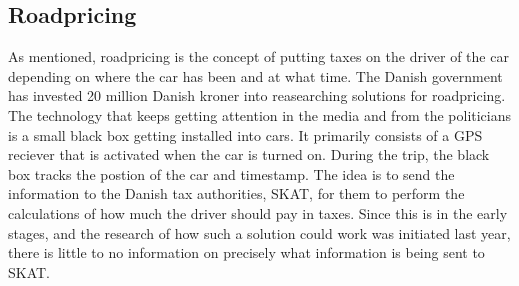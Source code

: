 \subsection{Roadpricing}
As mentioned, roadpricing is the concept of putting taxes on the driver of the car depending on where the car has been and at what time. The Danish government has invested 20 million Danish kroner into reasearching solutions for roadpricing. The technology that keeps getting attention in the media and from the politicians is a small black box getting installed into cars. It primarily consists of a GPS reciever that is activated when the car is turned on. During the trip, the black box tracks the postion of the car and timestamp. The idea is to send the information to the Danish tax authorities, SKAT, for them to perform the calculations of how much the driver should pay in taxes. Since this is in the early stages, and the research of how such a solution could work was initiated last year, there is little to no information on precisely what information is being sent to SKAT.